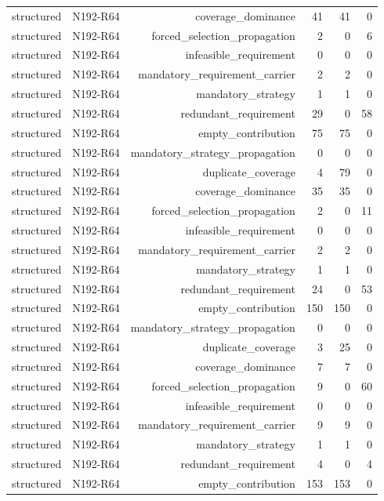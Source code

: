 {\begin{longtable}{lrrrrr}
structured & N192-R64 & coverage\_dominance & 41 & 41 & 0 \\
structured & N192-R64 & forced\_selection\_propagation & 2 & 0 & 6 \\
structured & N192-R64 & infeasible\_requirement & 0 & 0 & 0 \\
structured & N192-R64 & mandatory\_requirement\_carrier & 2 & 2 & 0 \\
structured & N192-R64 & mandatory\_strategy & 1 & 1 & 0 \\
structured & N192-R64 & redundant\_requirement & 29 & 0 & 58 \\
structured & N192-R64 & empty\_contribution & 75 & 75 & 0 \\
structured & N192-R64 & mandatory\_strategy\_propagation & 0 & 0 & 0 \\
structured & N192-R64 & duplicate\_coverage & 4 & 79 & 0 \\
structured & N192-R64 & coverage\_dominance & 35 & 35 & 0 \\
structured & N192-R64 & forced\_selection\_propagation & 2 & 0 & 11 \\
structured & N192-R64 & infeasible\_requirement & 0 & 0 & 0 \\
structured & N192-R64 & mandatory\_requirement\_carrier & 2 & 2 & 0 \\
structured & N192-R64 & mandatory\_strategy & 1 & 1 & 0 \\
structured & N192-R64 & redundant\_requirement & 24 & 0 & 53 \\
structured & N192-R64 & empty\_contribution & 150 & 150 & 0 \\
structured & N192-R64 & mandatory\_strategy\_propagation & 0 & 0 & 0 \\
structured & N192-R64 & duplicate\_coverage & 3 & 25 & 0 \\
structured & N192-R64 & coverage\_dominance & 7 & 7 & 0 \\
structured & N192-R64 & forced\_selection\_propagation & 9 & 0 & 60 \\
structured & N192-R64 & infeasible\_requirement & 0 & 0 & 0 \\
structured & N192-R64 & mandatory\_requirement\_carrier & 9 & 9 & 0 \\
structured & N192-R64 & mandatory\_strategy & 1 & 1 & 0 \\
structured & N192-R64 & redundant\_requirement & 4 & 0 & 4 \\
structured & N192-R64 & empty\_contribution & 153 & 153 & 0 \\

\end{longtable}}
